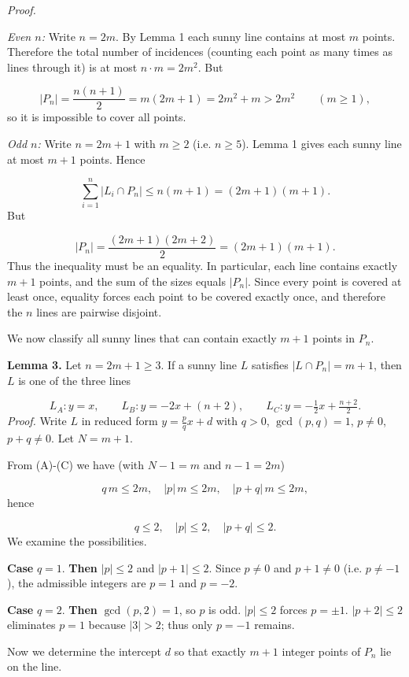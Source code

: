 \documentclass{llmxive}
\begin{document}
\emph{Proof.}\par
\emph{Even \(n\):} Write \(n = 2m\). By Lemma 1 each sunny line contains at most \(m\) points. Therefore the total number of incidences (counting each point as many times as lines through it) is at most \(n \cdot m = 2m^2\). But\par
\[
|P_n| = \frac{n(n+1)}{2} = m(2m+1) = 2m^2 + m > 2m^2 \qquad (m\ge1),
\]
so it is impossible to cover all points.\par
\emph{Odd \(n\):} Write \(n = 2m+1\) with \(m \ge 2\) (i.e. \(n \ge 5\)). Lemma 1 gives each sunny line at most \(m+1\) points. Hence\par
\[
\sum_{i=1}^{n} |L_i \cap P_n| \le n (m+1) = (2m+1)(m+1).
\]
But\par
\[
|P_n| = \frac{(2m+1)(2m+2)}{2} = (2m+1)(m+1).
\]
Thus the inequality must be an equality. In particular, each line contains exactly \(m+1\) points, and the sum of the sizes equals \(|P_n|\). Since every point is covered at least once, equality forces each point to be covered exactly once, and therefore the \(n\) lines are pairwise disjoint.\par
We now classify all sunny lines that can contain exactly \(m+1\) points in \(P_n\).\par
\textbf{Lemma 3.} Let \(n = 2m+1 \ge 3\). If a sunny line \(L\) satisfies \(|L \cap P_n| = m+1\), then \(L\) is one of the three lines\par
\[
L_A: y = x,\qquad L_B: y = -2x + (n+2),\qquad L_C: y = -\tfrac12 x + \tfrac{n+2}{2}.
\]
\emph{Proof.} Write \(L\) in reduced form \(y = \frac{p}{q}x + d\) with \(q>0\), \(\gcd(p,q)=1\), \(p \neq 0\), \(p+q \neq 0\). Let \(N = m+1\).\par
From (A)-(C) we have (with \(N-1 = m\) and \(n-1 = 2m\))\par
\[
q\,m \le 2m,\quad |p|\,m \le 2m,\quad |p+q|\,m \le 2m,
\]
hence\par
\[
q \le 2,\quad |p| \le 2,\quad |p+q| \le 2.
\]
We examine the possibilities.\par
\textbf{Case }\(q = 1\).\textbf{ Then }\(|p| \le 2\) and \(|p+1| \le 2\). Since \(p \neq 0\) and \(p+1 \neq 0\) (i.e. \(p \neq -1\)), the admissible integers are \(p = 1\) and \(p = -2\).\par
\textbf{Case }\(q = 2\).\textbf{ Then }\(\gcd(p,2)=1\), so \(p\) is odd. \(|p| \le 2\) forces \(p = \pm 1\). \(|p+2| \le 2\) eliminates \(p = 1\) because \(|3| > 2\); thus only \(p = -1\) remains.\par
Now we determine the intercept \(d\) so that exactly \(m+1\) integer points of \(P_n\) lie on the line.\par
\end{document}
